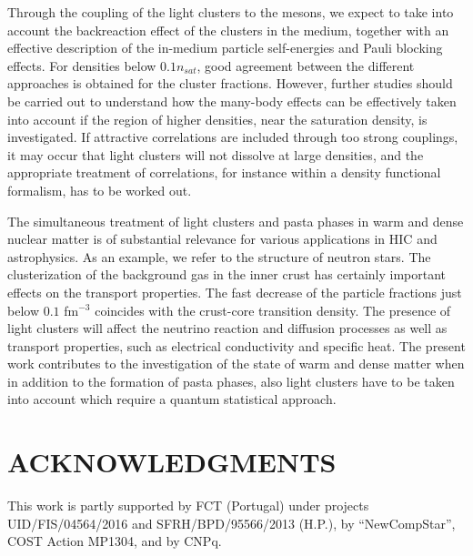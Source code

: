\documentclass[aps,prc,nofootinbib,twocolumn,showpacs]{revtex4-1}
\begin{document}
 Through the coupling of the light clusters to the mesons,
we expect to take into account the  backreaction effect of the clusters in the
medium, together with an effective description of the in-medium
particle self-energies and Pauli blocking effects. For densities below $0.1 n_{sat}$, good agreement between the different approaches is obtained for the cluster fractions.  However, further
studies should be carried out to understand how the many-body effects
can be effectively taken into account if the region of higher densities, near the saturation density, is investigated. If attractive correlations are included through too strong couplings, 
it  may occur that light clusters will not dissolve at large densities, and the appropriate treatment of correlations, for instance within a density functional formalism, has to be worked out.

 
The simultaneous treatment of light clusters and pasta phases in warm and dense nuclear matter is of substantial relevance for various applications in HIC and astrophysics. As an example, we refer to the structure of neutron stars. The clusterization of the background gas in the inner crust
has certainly important effects on the transport properties. 
The fast decrease of the particle fractions just below $0.1$ fm$^{-3}$
coincides with the crust-core transition density. The presence of light clusters will affect 
the neutrino reaction and diffusion processes as well as
transport properties, such as electrical conductivity and specific heat. The present work contributes to the investigation of the state of warm and dense matter  when in addition to the formation of pasta phases, also light clusters have to be taken into account which require a quantum statistical approach.







\section*{ACKNOWLEDGMENTS}

This work  is  partly  supported  by FCT (Portugal) under projects
UID/FIS/04564/2016 and  SFRH/BPD/95566/2013 (H.P.), by
``NewCompStar'', COST Action MP1304, and by CNPq. 

\end{document}
